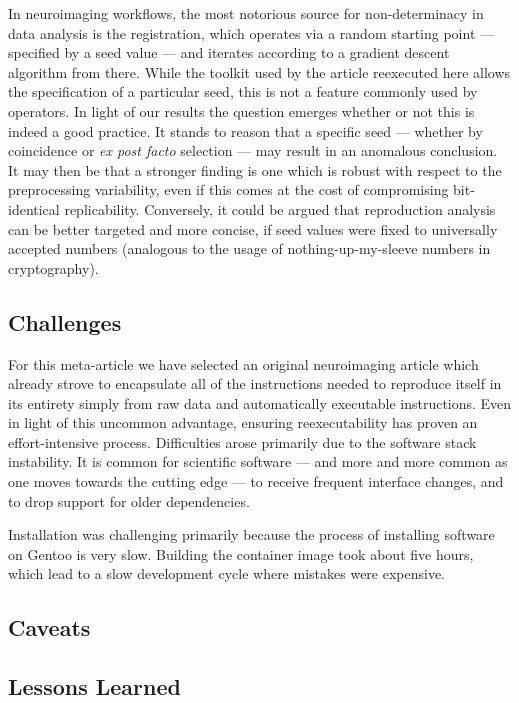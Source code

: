 In neuroimaging workflows, the most notorious source for non-determinacy in data analysis is the registration, which operates via a random starting point — specified by a seed value — and iterates according to a gradient descent algorithm from there.
While the toolkit used by the article reexecuted here allows the specification of a particular seed, this is not a feature commonly used by operators.
In light of our results the question emerges whether or not this is indeed a good practice.
It stands to reason that a specific seed — whether by coincidence or \textit{ex post facto} selection — may result in an anomalous conclusion.
It may then be that a stronger finding is one which is robust with respect to the preprocessing variability, even if this comes at the cost of compromising bit-identical replicability.
Conversely, it could be argued that reproduction analysis can be better targeted and more concise, if seed values were fixed to universally accepted numbers (analogous to the usage of nothing-up-my-sleeve numbers in cryptography).

\subsection{Challenges}
For this meta-article we have selected an original neuroimaging article which already strove to encapsulate all of the instructions needed to reproduce itself in its entirety simply from raw data and automatically executable instructions.
Even in light of this uncommon advantage, ensuring reexecutability has proven an effort-intensive process.
Difficulties arose primarily due to the software stack instability.
It is common for scientific software — and more and more common as one moves towards the cutting edge — to receive frequent interface changes, and to drop support for older dependencies.


Installation was challenging primarily because the process of installing
software on Gentoo is very slow. Building the container image took
about five hours, which lead to a slow development cycle where mistakes
were expensive.

\subsection{Caveats}

\subsection{Lessons Learned}

